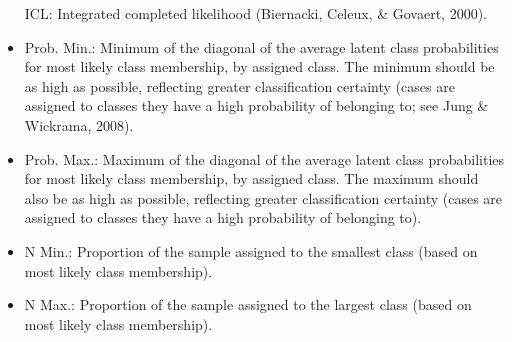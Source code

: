 \documentclass[]{article}
\begin{document}
\begin{itemize}
  ICL: Integrated completed likelihood (Biernacki, Celeux, \& Govaert,
  2000).\\
\item
  Prob. Min.: Minimum of the diagonal of the average latent class
  probabilities for most likely class membership, by assigned class. The
  minimum should be as high as possible, reflecting greater
  classification certainty (cases are assigned to classes they have a
  high probability of belonging to; see Jung \& Wickrama, 2008).\\
\item
  Prob. Max.: Maximum of the diagonal of the average latent class
  probabilities for most likely class membership, by assigned class. The
  maximum should also be as high as possible, reflecting greater
  classification certainty (cases are assigned to classes they have a
  high probability of belonging to).
\item
  N Min.: Proportion of the sample assigned to the smallest class (based
  on most likely class membership).\\
\item
  N Max.: Proportion of the sample assigned to the largest class (based
  on most likely class membership).
\end{itemize}
\end{document}
